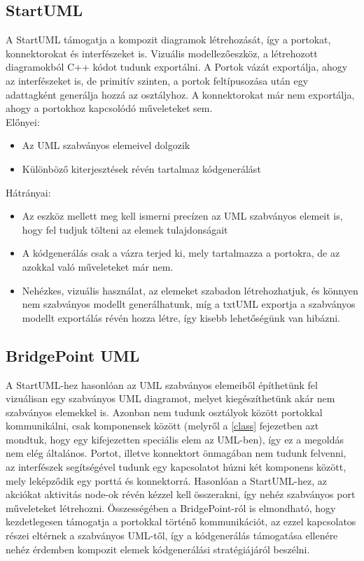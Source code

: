 \documentclass[a4paper,12pt]{report}
\begin{document}
\subsection{StartUML}
A StartUML  támogatja a kompozit diagramok létrehozását, így a portokat, konnektorokat és interfészeket is. Vizuális modellezőeszköz, a létrehozott diagramokból C++ kódot tudunk exportálni. A Portok vázát exportálja, ahogy az interfészeket is, de primitív szinten, a portok feltípusozása után egy adattagként generálja hozzá az osztályhoz. A konnektorokat már nem exportálja, ahogy a portokhoz kapcsolódó műveleteket sem. \\
Előnyei:
\begin{itemize}
\item Az UML szabványos elemeivel dolgozik
\item Különböző kiterjesztések révén tartalmaz kódgenerálást
\end{itemize}
Hátrányai:
\begin{itemize}
\item Az eszköz mellett meg kell ismerni precízen az UML szabványos elemeit is, hogy fel tudjuk tölteni az elemek tulajdonságait
\item A kódgenerálás csak a vázra terjed ki, mely tartalmazza a portokra, de az azokkal való műveleteket már nem.
\item Nehézkes, vizuális használat, az elemeket szabadon létrehozhatjuk, és könnyen nem szabványos modellt generálhatunk, míg a txtUML exportja a szabványos modellt exportálás révén hozza létre, így kisebb lehetőségünk van hibázni.
\end{itemize}

\subsection{BridgePoint UML}
A StartUML-hez hasonlóan az UML szabványos elemeiből építhetünk fel vizuálisan egy szabványos UML diagramot, melyet kiegészíthetünk akár nem szabványos elemekkel is. Azonban nem tudunk osztályok között portokkal kommunikálni, csak komponensek között (melyről a \ref{class} fejezetben azt mondtuk, hogy egy kifejezetten speciális elem az UML-ben), így ez a megoldás nem elég általános. Portot, illetve konnektort önmagában nem tudunk felvenni, az interfészek segítségével tudunk egy kapcsolatot húzni két komponens között, mely leképződik egy porttá és konnektorrá. Hasonlóan a StartUML-hez, az akciókat aktivitás node-ok révén kézzel kell összerakni, így nehéz szabványos port műveleteket létrehozni. Összességében a BridgePoint-ról \cite{bridge} is elmondható, hogy kezdetlegesen támogatja a portokkal történő kommunikációt, az ezzel kapcsolatos részei eltérnek a szabványos UML-től, így a kódgenerálás támogatása ellenére nehéz érdemben kompozit elemek kódgenerálási stratégiájáról beszélni. 
\end{document}
